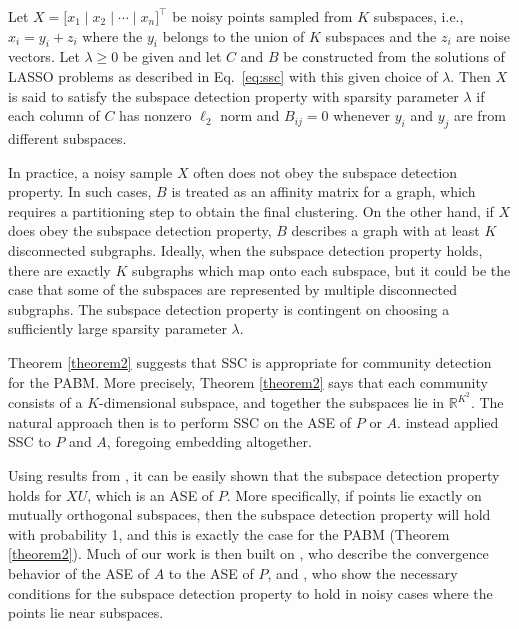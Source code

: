 \documentclass[12pt]{article}
\begin{document}
\begin{definition}
  \label{def:subspace_detection}
Let $X = \bigl[ x_1 \mid x_2 \mid \cdots \mid x_n \bigr]^\top$ be noisy
points sampled from $K$ subspaces, i.e., $x_i = y_i + z_i$ where the
$y_i$ belongs to the union of $K$ subspaces and the $z_i$ are noise
vectors. Let $\lambda \geq 0$ be given and
let $C$ and $B$ be constructed from the
solutions of LASSO problems as described in Eq.~\eqref{eq:ssc} with
this given choice of $\lambda$. Then $X$
is said to satisfy the subspace detection property 
with sparsity parameter $\lambda$ if each column of
$C$ has nonzero $\ell_2$ norm and $B_{ij} = 0$ whenever $y_i$ and $y_j$ are
from different subspaces.
\end{definition}

\begin{remark}
In practice, a noisy sample $X$ often does not obey the subspace detection
property. In such cases, $B$ is treated as an affinity matrix for a graph, 
which requires a partitioning step to obtain the final clustering. On the other
hand, if $X$ does obey the subspace detection property, $B$ describes a graph
with at least $K$ disconnected subgraphs. Ideally, when the subspace detection
property holds, there are exactly $K$ subgraphs which map onto each subspace,
but it could be the case that some of the subspaces are represented by
multiple disconnected subgraphs. The subspace detection property is contingent
on choosing a sufficiently large sparsity parameter $\lambda$.
\end{remark}

Theorem \ref{theorem2} suggests that SSC is appropriate for community
detection for the PABM. More precisely, Theorem \ref{theorem2} says that
each community consists of a \(K\)-dimensional subspace, and together
the subspaces lie in \(\mathbb{R}^{K^2}\). The natural approach then is
to perform SSC on the ASE of \(P\) or \(A\).
\citet{noroozi2019estimation} instead applied SSC to \(P\) and
\(A\), foregoing embedding altogether.

Using results from \citet{soltanolkotabi2012}, it can be easily shown
that the subspace detection property holds for \(XU\), which is an ASE
of \(P\). More specifically, if points lie exactly on mutually
orthogonal subspaces, then the subspace detection property will hold
with probability 1, and this is exactly the case for the PABM (Theorem
\ref{theorem2}). Much of our work is then built on
\citet{rubindelanchy2017statistical}, who describe the convergence
behavior of the ASE of \(A\) to the ASE of \(P\), and
\citet{jmlr-v28-wang13}, who show the necessary conditions for the
subspace detection property to hold in noisy cases where the points lie
near subspaces.
\end{document}
